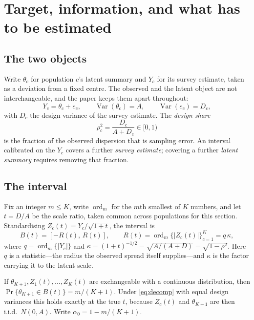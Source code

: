 \section{Target, information, and what has to be estimated}\label{sec:target}

\subsection{The two objects}

Write $\theta_c$ for population $c$'s latent summary and $Y_c$ for its survey
estimate, taken as a deviation from a fixed centre. The observed and the latent
object are not interchangeable, and the paper keeps them apart throughout:
\begin{equation}\label{eq:decomp}
Y_c=\theta_c+e_c,\qquad \operatorname{Var}(\theta_c)=A,\qquad
\operatorname{Var}(e_c)=D_c ,
\end{equation}
with $D_c$ the design variance of the survey estimate. The \emph{design share}
\begin{equation}\label{eq:rho}
\rho_c^2=\frac{D_c}{A+D_c}\in[0,1)
\end{equation}
is the fraction of the observed dispersion that is sampling error. An interval
calibrated on the $Y_c$ covers a further \emph{survey estimate}; covering a
further \emph{latent summary} requires removing that fraction.

\subsection{The interval}

Fix an integer $m\le K$, write $\operatorname{ord}_m$ for the $m$th smallest of
$K$ numbers, and let $t=D/A$ be the scale ratio, taken common across populations
for this section. Standardising $Z_c(t)=Y_c/\sqrt{1+t}$, the interval is
\begin{equation}\label{eq:band}
B(t)=[-R(t),\,R(t)],\qquad
R(t)=\operatorname{ord}_m\{|Z_c(t)|\}_{c=1}^K=q\,\kappa,
\end{equation}
where $q=\operatorname{ord}_m\{|Y_c|\}$ and
$\kappa=(1+t)^{-1/2}=\sqrt{A/(A+D)}=\sqrt{1-\rho^2}$. Here $q$ is a
statistic---the radius the observed spread itself supplies---and $\kappa$ is the
factor carrying it to the latent scale.

\begin{lemma}\label{lem:rank}
If $\theta_{K+1},Z_1(t),\dots,Z_K(t)$ are exchangeable with a continuous
distribution, then $\Pr\{\theta_{K+1}\in B(t)\}=m/(K+1)$. Under
\eqref{eq:decomp} with equal design variances this holds exactly at the true $t$,
because $Z_c(t)$ and $\theta_{K+1}$ are then i.i.d.\ $N(0,A)$. Write
$\alpha_0=1-m/(K+1)$.
\end{lemma}

